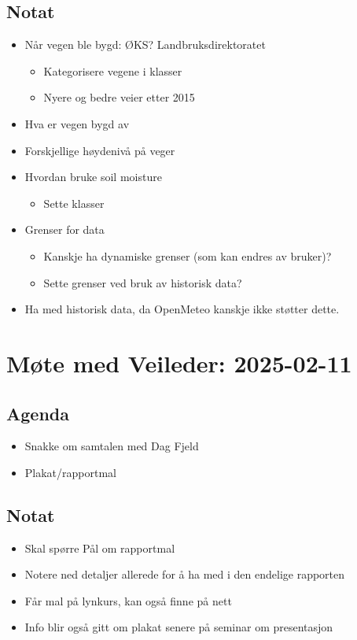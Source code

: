\subsection*{Notat}

\begin{itemize}
\item
  Når vegen ble bygd: ØKS? Landbruksdirektoratet

  \begin{itemize}
  
  \item
    Kategorisere vegene i klasser
  \item
    Nyere og bedre veier etter 2015
  \end{itemize}
\item
  Hva er vegen bygd av
\item
  Forskjellige høydenivå på veger
\item
  Hvordan bruke soil moisture

  \begin{itemize}
  \item
    Sette klasser
  \end{itemize}
\item
  Grenser for data

  \begin{itemize}
  \item
    Kanskje ha dynamiske grenser (som kan endres av bruker)?
  \item
    Sette grenser ved bruk av historisk data?
  \end{itemize}
\item
  Ha med historisk data, da OpenMeteo kanskje ikke støtter dette.
\end{itemize}

\section*{Møte med Veileder: 2025-02-11}

\subsection*{Agenda}

\begin{itemize}
\item
  Snakke om samtalen med Dag Fjeld
\item
  Plakat/rapportmal 
\end{itemize}

\subsection*{Notat}
\begin{itemize}
    \item
      Skal spørre Pål om rapportmal
    \item
      Notere ned detaljer allerede for å ha med i den endelige rapporten
    \item
      Får mal på lynkurs, kan også finne på nett
    \item
      Info blir også gitt om plakat senere på seminar om presentasjon
\end{itemize}

